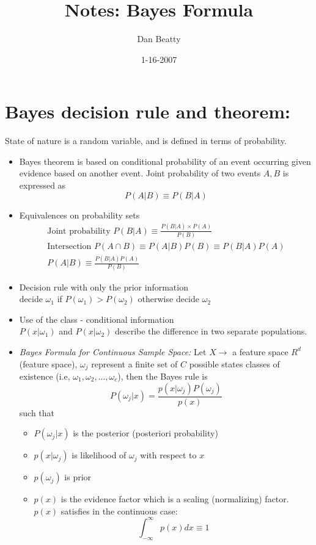 \documentclass[11pt]{article}
\title{Notes: Bayes Formula }
\author{Dan Beatty}
\begin{document}
\maketitle

\date{1-16-2007}
\section{Bayes decision rule and theorem:}
State of nature is a random variable, and is defined in terms of probability.  
\begin{itemize}
	\item Bayes theorem is based on conditional probability of an event occurring given evidence based on another event.  
	Joint probability of two events $A,B$ is expressed as 
	\[ 
	P (A|B ) \equiv P(B|A)
	\]
	\item Equivalences on probability sets
	\begin{eqnarray}
		\textrm{Joint probability } P(B|A) \equiv \frac{P(B|A) \times P(A)}{P(B)} \\
		\textrm{Intersection } P(A\cap B) \equiv P(A|B)P(B) \equiv P(B|A)P(A)\\
		P(A|B) \equiv \frac{P(B|A) P(A)}{P(B)} 
	\end{eqnarray}
	\item Decision rule with only the prior information \\
	decide $\omega_1$ if $P(\omega_1) > P(\omega_2)$ otherwise decide $\omega_2$
	\item Use of the class - conditional information \\
		$P(x | \omega_1)$ and $P(x | \omega_2)$ describe the difference in two separate populations. 
	\item \textsl{Bayes Formula for Continuous Sample Space:}  Let $X \to $ a feature space $R^d$  (feature space), $\omega _j$  represent a finite set of $C$ possible states classes of existence (i.e, $\omega_1, \omega_2, ..., \omega_c$), then the Bayes rule is 
		\[
		P(\omega_j | x) = \frac{p(x|\omega_j) P(\omega _j)} {p(x)}
		\]
		such that 
		\begin{itemize}
			\item $P(\omega_j | x)$ is the posterior (posteriori probability)
			\item $p(x| \omega_j)$ is likelihood of $\omega_j$ with respect to $x$
			\item $p(\omega_j)$ is prior
			\item $p(x)$ is the evidence factor which is a scaling (normalizing) factor.  $p(x)$ satisfies in the continuous case:
			\[
			\int ^{\infty}_{- \infty} p(x)dx \equiv 1
			\]
		\end{itemize}
		

\end{itemize}
\end{document}

